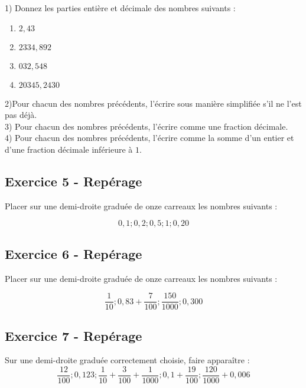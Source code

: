\documentclass[12 pt]{extarticle}
\theoremstyle{plain}
\begin{document}
1) Donnez les parties entière et décimale des nombres suivants : 
\begin{enumerate}
\item $2,43$
\item $2334,892$
\item $032,548$
\item $20345,2430$
\end{enumerate}


2)Pour chacun des nombres précédents, l'écrire sous manière simplifiée s'il ne l'est pas déjà. \\

3) Pour chacun des nombres précédents, l'écrire comme une fraction décimale. 
\\

4) Pour chacun des nombres précédents, l'écrire comme la somme d'un entier et d'une fraction décimale inférieure à $1$. 


\subsection*{Exercice 5 - Repérage}

Placer sur une demi-droite graduée de onze carreaux les nombres suivants : 

\[ 0,1 ; 0,2 ; 0,5 ; 1 ; 0,20 \]

\subsection*{Exercice 6 - Repérage}

Placer sur une demi-droite graduée de onze carreaux les nombres suivants : 

\[ \frac1{10} ; 0,83+ \frac{7}{100} ; \frac{150}{1000}; 0,300 \]

\subsection*{Exercice 7 - Repérage}

Sur une demi-droite graduée correctement choisie, faire apparaître : 
\[ \frac{12}{100} ; 0,123 ; \frac1{10} + \frac3{100} + \frac1{1000} ; 0,1 + \frac{19}{100} ; \frac{120}{1000} + 0,006\]

 	
\end{document}
